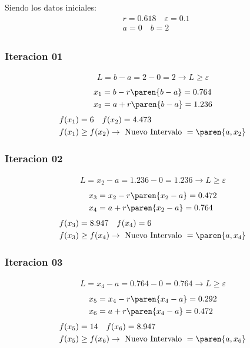 \begin{homeworkProblem}
Siendo los datos iniciales:
\begin{align*}
    &r=0.618\quad \varepsilon = 0.1 \\
    &a=0\quad  b=2\\
\end{align*}


\subsubsection{Iteracion 01}
\begin{align*}
    L=b-a=2-0=2 \rightarrow L \geq \varepsilon
\end{align*}
\begin{align*}
    &x_1=b - r\paren{b-a}= 0.764 \\
    &x_2=a + r\paren{b-a}= 1.236 
\end{align*}
\begin{align*}
    &f(x_1)=6 \quad f(x_2)=4.473 \\
    &f(x_1) \geq f(x_2) \rightarrow \text{ Nuevo Intervalo } = \paren{a,x_2}
\end{align*}


\subsubsection{Iteracion 02}
\begin{align*}
    L=x_2-a=1.236-0=1.236 \rightarrow L \geq \varepsilon
\end{align*}
\begin{align*}
    &x_3=x_2 - r\paren{x_2-a}= 0.472 \\
    &x_4=a + r\paren{x_2-a}= 0.764
\end{align*}
\begin{align*}
    &f(x_3)=8.947 \quad f(x_4)=6 \\
    &f(x_3) \geq f(x_4) \rightarrow \text{ Nuevo Intervalo } = \paren{a,x_4}
\end{align*}


\subsubsection{Iteracion 03}
\begin{align*}
    L=x_4-a=0.764-0=0.764 \rightarrow L \geq \varepsilon
\end{align*}
\begin{align*}
    &x_5=x_4 - r\paren{x_4-a}= 0.292 \\
    &x_6=a + r\paren{x_4-a}= 0.472
\end{align*}
\begin{align*}
    &f(x_5)=14 \quad f(x_6)=8.947 \\
    &f(x_5) \geq f(x_6) \rightarrow \text{ Nuevo Intervalo } = \paren{a,x_6}
\end{align*}


\end{homeworkProblem}
